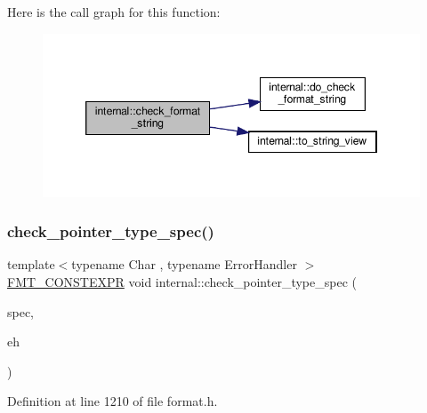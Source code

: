 Here is the call graph for this function\+:
\nopagebreak
\begin{figure}[H]
\begin{center}
\leavevmode
\includegraphics[width=346pt]{namespaceinternal_a6184fcc754b94046ef76495b8b105024_cgraph}
\end{center}
\end{figure}
\mbox{\label{namespaceinternal_a02f06fb6d5107704cd0d83a03c133905}} 
\subsubsection{\texorpdfstring{check\+\_\+pointer\+\_\+type\+\_\+spec()}{check\_pointer\_type\_spec()}}
{\footnotesize\ttfamily template$<$typename Char , typename Error\+Handler $>$ \\
\hyperlink{core_8h_a69201cb276383873487bf68b4ef8b4cd}{F\+M\+T\+\_\+\+C\+O\+N\+S\+T\+E\+X\+PR} void internal\+::check\+\_\+pointer\+\_\+type\+\_\+spec (\begin{DoxyParamCaption}\item[{Char}]{spec,  }\item[{Error\+Handler \&\&}]{eh }\end{DoxyParamCaption})}



Definition at line 1210 of file format.\+h.

